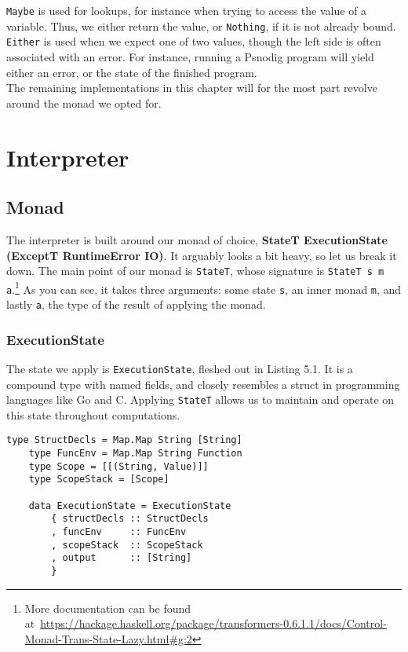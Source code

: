 \texttt{Maybe} is used for lookups, for instance when trying to access the value of a variable. Thus, we either return the value, or \texttt{Nothing}, if it is not already bound. \texttt{Either} is used when we expect one of two values, though the left side is often associated with an error. For instance, running a Psnodig program will yield either an error, or the state of the finished program. \hfill \\

The remaining implementations in this chapter will for the most part revolve around the monad we opted for.

\section{Interpreter}

\subsection{Monad}

The interpreter is built around our monad of choice, \textbf{StateT ExecutionState (ExceptT RuntimeError IO)}. It arguably looks a bit heavy, so let us break it down. The main point of our monad is \texttt{StateT}, whose signature is \texttt{StateT s m a}.\footnote{More documentation can be found at~\url{https://hackage.haskell.org/package/transformers-0.6.1.1/docs/Control-Monad-Trans-State-Lazy.html\#g:2}} As you can see, it takes three arguments: some state \texttt{s}, an inner monad \texttt{m}, and lastly \texttt{a}, the type of the result of applying the monad.

\subsubsection{ExecutionState}

The state we apply is \texttt{ExecutionState}, fleshed out in Listing 5.1. It is a compound type with named fields, and closely resembles a struct in programming languages like Go and C. Applying \texttt{StateT} allows us to maintain and operate on this state throughout computations. \hfill \\

\begin{lstlisting}[caption={The Psnodig interpreter's state}, captionpos=b, frame=trbl]
    type StructDecls = Map.Map String [String]
    type FuncEnv = Map.Map String Function
    type Scope = [[(String, Value)]]
    type ScopeStack = [Scope]

    data ExecutionState = ExecutionState
        { structDecls :: StructDecls
        , funcEnv     :: FuncEnv
        , scopeStack  :: ScopeStack
        , output      :: [String]
        }
\end{lstlisting}

